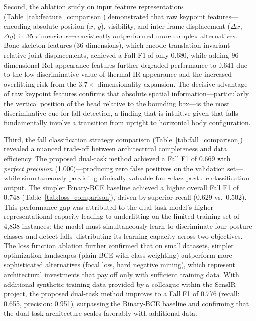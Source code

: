 Second, the ablation study on input feature representations (Table~\ref{tab:feature_comparison}) demonstrated that raw keypoint features---encoding absolute position ($x$, $y$), visibility, and inter-frame displacement ($\Delta x$, $\Delta y$) in 35 dimensions---consistently outperformed more complex alternatives. Bone skeleton features (36 dimensions), which encode translation-invariant relative joint displacements, achieved a Fall F1 of only 0.680, while adding 96-dimensional RoI appearance features further degraded performance to 0.641 due to the low discriminative value of thermal IR appearance and the increased overfitting risk from the $3.7\times$ dimensionality expansion. The decisive advantage of raw keypoint features confirms that absolute spatial information---particularly the vertical position of the head relative to the bounding box---is the most discriminative cue for fall detection, a finding that is intuitive given that falls fundamentally involve a transition from upright to horizontal body configuration.

Third, the fall classification strategy comparison (Table~\ref{tab:fall_comparison}) revealed a nuanced trade-off between architectural completeness and data efficiency. The proposed dual-task method achieved a Fall F1 of 0.669 with \emph{perfect precision} (1.000)---producing zero false positives on the validation set---while simultaneously providing clinically valuable four-class posture classification output. The simpler Binary-BCE baseline achieved a higher overall Fall F1 of 0.748 (Table~\ref{tab:loss_comparison}), driven by superior recall (0.629 vs.\ 0.502). This performance gap was attributed to the dual-task model's higher representational capacity leading to underfitting on the limited training set of 4{,}838 instances: the model must simultaneously learn to discriminate four posture classes and detect falls, distributing its learning capacity across two objectives. The loss function ablation further confirmed that on small datasets, simpler optimization landscapes (plain BCE with class weighting) outperform more sophisticated alternatives (focal loss, hard negative mining), which represent architectural investments that pay off only with sufficient training data. With additional synthetic training data provided by a colleague within the SensIR project, the proposed dual-task method improves to a Fall F1 of 0.776 (recall: 0.655, precision: 0.951), surpassing the Binary-BCE baseline and confirming that the dual-task architecture scales favorably with additional data.

